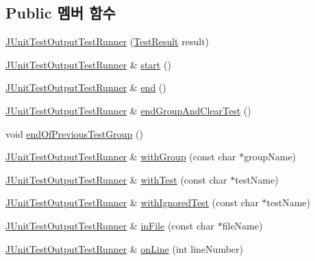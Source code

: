 \subsection*{Public 멤버 함수}
\begin{DoxyCompactItemize}
\item 
\hyperlink{class_j_unit_test_output_test_runner_afebde51f743f71692bfde78242040437}{J\+Unit\+Test\+Output\+Test\+Runner} (\hyperlink{class_test_result}{Test\+Result} result)
\item 
\hyperlink{class_j_unit_test_output_test_runner}{J\+Unit\+Test\+Output\+Test\+Runner} \& \hyperlink{class_j_unit_test_output_test_runner_a82cc40a653b2adad4064bb14677091be}{start} ()
\item 
\hyperlink{class_j_unit_test_output_test_runner}{J\+Unit\+Test\+Output\+Test\+Runner} \& \hyperlink{class_j_unit_test_output_test_runner_a11f70884f2d472d735acef3103b5cad2}{end} ()
\item 
\hyperlink{class_j_unit_test_output_test_runner}{J\+Unit\+Test\+Output\+Test\+Runner} \& \hyperlink{class_j_unit_test_output_test_runner_a48673e13e0977105e5e15eb655c857ad}{end\+Group\+And\+Clear\+Test} ()
\item 
void \hyperlink{class_j_unit_test_output_test_runner_a4063997c510580fc7402570c52bd37ba}{end\+Of\+Previous\+Test\+Group} ()
\item 
\hyperlink{class_j_unit_test_output_test_runner}{J\+Unit\+Test\+Output\+Test\+Runner} \& \hyperlink{class_j_unit_test_output_test_runner_aac43a49a777a95d41717058377c5ede7}{with\+Group} (const char $\ast$group\+Name)
\item 
\hyperlink{class_j_unit_test_output_test_runner}{J\+Unit\+Test\+Output\+Test\+Runner} \& \hyperlink{class_j_unit_test_output_test_runner_afd5037e28120f0c0153a8e5fc6ee2c4b}{with\+Test} (const char $\ast$test\+Name)
\item 
\hyperlink{class_j_unit_test_output_test_runner}{J\+Unit\+Test\+Output\+Test\+Runner} \& \hyperlink{class_j_unit_test_output_test_runner_a9a4d77db19107dae76a713b709b291cf}{with\+Ignored\+Test} (const char $\ast$test\+Name)
\item 
\hyperlink{class_j_unit_test_output_test_runner}{J\+Unit\+Test\+Output\+Test\+Runner} \& \hyperlink{class_j_unit_test_output_test_runner_ab4faa85a917794ca63cedca60a0f3a57}{in\+File} (const char $\ast$file\+Name)
\item 
\hyperlink{class_j_unit_test_output_test_runner}{J\+Unit\+Test\+Output\+Test\+Runner} \& \hyperlink{class_j_unit_test_output_test_runner_a47739d685bd5ddd4c228055e59d997d1}{on\+Line} (int line\+Number)

\end{DoxyCompactItemize}
